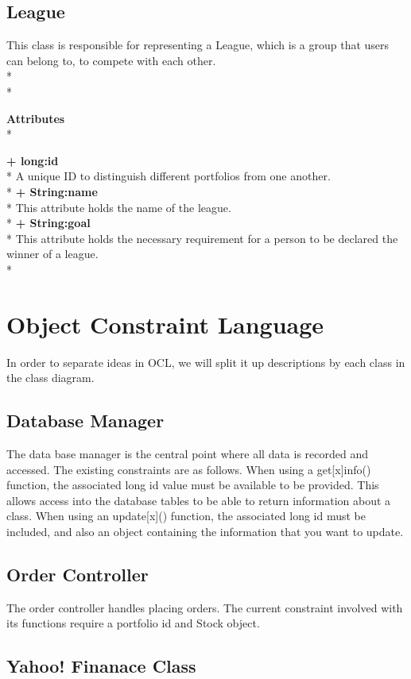 \subsection{League}
This class is responsible for representing a League, which is a group that
users can belong to, to compete with each other.\\* \\*

{\bfseries Attributes} \\*

{\bfseries + long:id} \\*
A unique ID to distinguish different portfolios from one another.\\*
{\bfseries + String:name} \\*
This attribute holds the name of the league.\\*
{\bfseries + String:goal} \\*
This attribute holds the necessary requirement for a person to be declared the
winner of a league. \\*

\section{Object Constraint Language}

In order to separate ideas in OCL, we will split it up descriptions by each
class in the class diagram.

\subsection{Database Manager}
The data base manager is the central point where all data is recorded and
accessed. The existing constraints are as follows. When using a get[x]info()
function, the associated long id value must be available to be provided.
This allows access into the database tables to be able to return information
about a class. When using an update[x]() function, the associated long id must
be included, and also an object containing the information that you want to
update.

\subsection{Order Controller}
The order controller handles placing orders. The current constraint involved
with its functions require a portfolio id and Stock object.

\subsection{Yahoo! Finanace Class}


